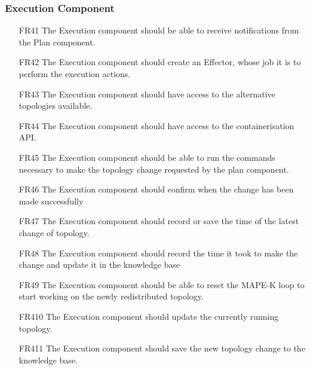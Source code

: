 \subsubsection{\textbf{Execution Component}}
\begin{itemize}
    \item [FR41] The Execution component should be able to receive notifications from the Plan component.
    \item [FR42] The Execution component should create an Effector, whose job it is to perform the execution actions.
    \item [FR43] The Execution component should have access to the alternative topologies available.
    \item [FR44] The Execution component should have access to the containerisation API.
    \item [FR45] The Execution component should be able to run the commands necessary to make the topology change requested by the plan component.
    \item [FR46] The Execution component should confirm when the change has been made successfully
    \item [FR47] The Execution component should record or save the time of the latest change of topology.
    \item [FR48] The Execution component should record the time it took to make the change and update it in the knowledge base
    \item [FR49] The Execution component should be able to reset the MAPE-K loop to start working on the newly redistributed topology.
    \item [FR410] The Execution component should update the currently running topology.
    \item [FR411] The Execution component should save the new topology change to the knowledge base.
\end{itemize}

